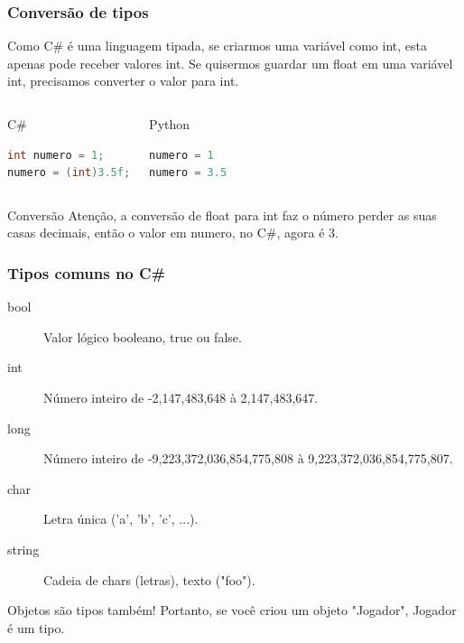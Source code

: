\documentclass{beamer}
\begin{document}
	\begin{frame}[fragile]
		\frametitle{Conversão de tipos}

		Como C\# é uma linguagem tipada, se criarmos uma variável como int, esta
		apenas pode receber valores int. Se quisermos guardar um float em uma
		variável int, precisamos converter o valor para int.

		\begin{columns}
			\begin{block}{C\#}
				\begin{lstlisting}[language=Java,basicstyle=\ttfamily,keywordstyle=\color{blue}]
int numero = 1;
numero = (int)3.5f;
				\end{lstlisting}
			\end{block}
			\begin{block}{Python}
				\begin{lstlisting}[language=Python,basicstyle=\ttfamily,keywordstyle=\color{blue}]
numero = 1
numero = 3.5
				\end{lstlisting}
			\end{block}
		\end{columns}

		\begin{alertblock}{Conversão}
			Atenção, a conversão de float para int faz o número perder as suas
			casas decimais, então o valor em numero, no C\#, agora é 3.
		\end{alertblock}

	\end{frame}

	\begin{frame}
		\frametitle{Tipos comuns no C\#}

		\begin{description}
			\item[bool] Valor lógico booleano, true ou false.
			\item[int] Número inteiro de -2,147,483,648 à 2,147,483,647.
			\item[long] Número inteiro de -9,223,372,036,854,775,808 à
				9,223,372,036,854,775,807.
			\item[char] Letra única ('a', 'b', 'c', ...).
			\item[string] Cadeia de chars (letras), texto ("foo").
		\end{description}

		Objetos são tipos também! Portanto, se você criou um objeto "Jogador",
		Jogador é um tipo.
	\end{frame}
\end{document}
